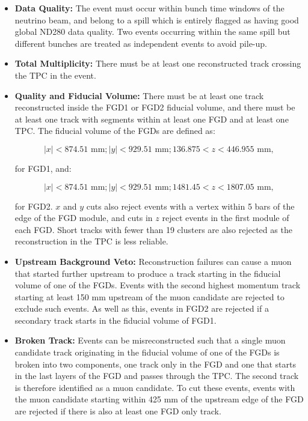 \begin{itemize}

\item \textbf{Data Quality:} The event must occur within bunch time windows of the neutrino beam, and belong to a spill which is entirely flagged as having good global ND280 data quality. Two events occurring within the same spill but different bunches are treated as independent events to avoid pile-up.

\item \textbf{Total Multiplicity:} There must be at least one reconstructed track crossing the TPC in the event.

\item \textbf{Quality and Fiducial Volume:} There must be at least one track reconstructed inside the FGD1 or FGD2 fiducial volume, and there must be at least one track with segments within at least one FGD and at least one TPC. The fiducial volume of the FGDs are defined as:

\begin{equation}
|x| < 874.51 \textrm{ mm}; |y| < 929.51 \textrm{ mm}; 136.875 < z < 446.955 \textrm{ mm},
\end{equation}

for FGD1, and:

\begin{equation}
|x| < 874.51 \textrm{ mm}; |y| < 929.51 \textrm{ mm}; 1481.45 < z < 1807.05 \textrm{ mm},
\end{equation}

for FGD2. $x$ and $y$ cuts also reject events with a vertex within 5 bars of the edge of the FGD module, and cuts in $z$ reject events in the first module of each FGD. Short tracks with fewer than 19 clusters are also rejected as the reconstruction in the TPC is less reliable.

\item \textbf{Upstream Background Veto:} Reconstruction failures can cause a muon that started further upstream to produce a track starting in the fiducial volume of one of the FGDs. Events with the second highest momentum track starting at least 150 mm upstream of the muon candidate are rejected to exclude such events. As well as this, events in FGD2 are rejected if a secondary track starts in the fiducial volume of FGD1.

\item \textbf{Broken Track:} Events can be misreconstructed such that a single muon candidate track originating in the fiducial volume of one of the FGDs is broken into two components, one track only in the FGD and one that starts in the last layers of the FGD and passes through the TPC. The second track is therefore identified as a muon candidate. To cut these events, events with the muon candidate starting within 425 mm of the upstream edge of the FGD are rejected if there is also at least one FGD only track.


\end{itemize}
